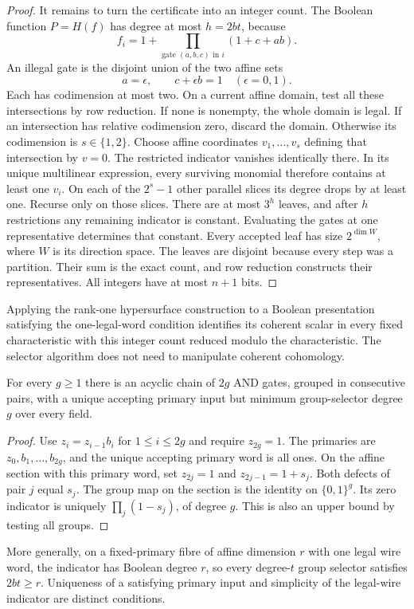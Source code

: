 \begin{proof}
It remains to turn the certificate into an integer count. The Boolean function $P=H(f)$ has degree at most $h=2bt$, because
\[
 f_i=1+\prod_{\text{gate }(a,b,c)\text{ in }i}(1+c+ab).
\]
An illegal gate is the disjoint union of the two affine sets
\[
 a=\epsilon,\qquad c+\epsilon b=1\quad(\epsilon=0,1).
\]
Each has codimension at most two. On a current affine domain, test all these intersections by row reduction. If none is nonempty, the whole domain is legal. If an intersection has relative codimension zero, discard the domain. Otherwise its codimension is $s\in\{1,2\}$. Choose affine coordinates $v_1,\ldots,v_s$ defining that intersection by $v=0$. The restricted indicator vanishes identically there. In its unique multilinear expression, every surviving monomial therefore contains at least one $v_i$. On each of the $2^s-1$ other parallel slices its degree drops by at least one. Recurse only on those slices. There are at most $3^h$ leaves, and after $h$ restrictions any remaining indicator is constant. Evaluating the gates at one representative determines that constant. Every accepted leaf has size $2^{\dim W}$, where $W$ is its direction space. The leaves are disjoint because every step was a partition. Their sum is the exact count, and row reduction constructs their representatives. All integers have at most $n+1$ bits.
\end{proof}

Applying the rank-one hypersurface construction to a Boolean presentation satisfying the one-legal-word condition identifies its coherent scalar in every fixed characteristic with this integer count reduced modulo the characteristic. The selector algorithm does not need to manipulate coherent cohomology.

\begin{proposition}
\label{st:chain}
For every $g\ge1$ there is an acyclic chain of $2g$ AND gates, grouped in consecutive pairs, with a unique accepting primary input but minimum group-selector degree $g$ over every field.
\end{proposition}
\begin{proof}
Use $z_i=z_{i-1}b_i$ for $1\le i\le2g$ and require $z_{2g}=1$. The primaries are $z_0,b_1,\ldots,b_{2g}$, and the unique accepting primary word is all ones. On the affine section with this primary word, set $z_{2j}=1$ and $z_{2j-1}=1+s_j$. Both defects of pair $j$ equal $s_j$. The group map on the section is the identity on $\{0,1\}^g$. Its zero indicator is uniquely $\prod_j(1-s_j)$, of degree $g$. This is also an upper bound by testing all groups.
\end{proof}
More generally, on a fixed-primary fibre of affine dimension $r$ with one legal wire word, the indicator has Boolean degree $r$, so every degree-$t$ group selector satisfies $2bt\ge r$. Uniqueness of a satisfying primary input and simplicity of the legal-wire indicator are distinct conditions.

